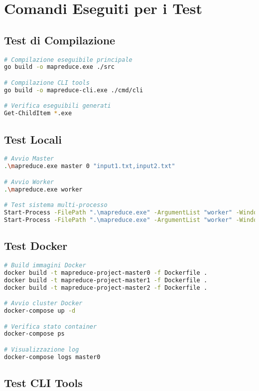 \documentclass[12pt,a4paper]{article}
\begin{document}
\section{Comandi Eseguiti per i Test}

\subsection{Test di Compilazione}

\begin{lstlisting}[language=bash]
# Compilazione eseguibile principale
go build -o mapreduce.exe ./src

# Compilazione CLI tools
go build -o mapreduce-cli.exe ./cmd/cli

# Verifica eseguibili generati
Get-ChildItem *.exe
\end{lstlisting}

\subsection{Test Locali}

\begin{lstlisting}[language=bash]
# Avvio Master
.\mapreduce.exe master 0 "input1.txt,input2.txt"

# Avvio Worker
.\mapreduce.exe worker

# Test sistema multi-processo
Start-Process -FilePath ".\mapreduce.exe" -ArgumentList "worker" -WindowStyle Hidden
Start-Process -FilePath ".\mapreduce.exe" -ArgumentList "worker" -WindowStyle Hidden
\end{lstlisting}

\subsection{Test Docker}

\begin{lstlisting}[language=bash]
# Build immagini Docker
docker build -t mapreduce-project-master0 -f Dockerfile .
docker build -t mapreduce-project-master1 -f Dockerfile .
docker build -t mapreduce-project-master2 -f Dockerfile .

# Avvio cluster Docker
docker-compose up -d

# Verifica stato container
docker-compose ps

# Visualizzazione log
docker-compose logs master0
\end{lstlisting}

\subsection{Test CLI Tools}
\end{document}
